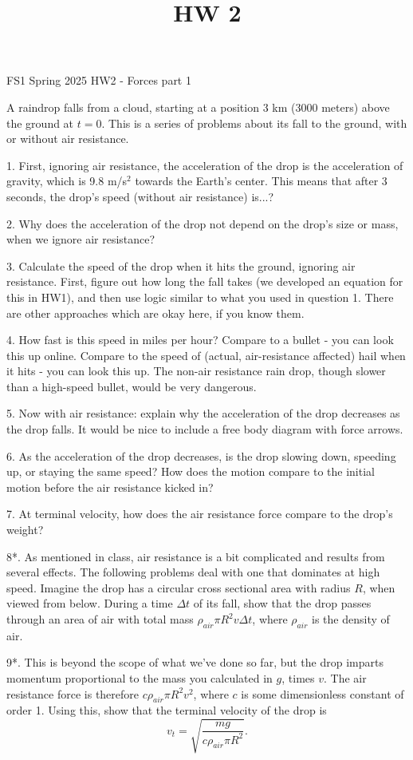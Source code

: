 \documentclass[12pt]{article}
\title{HW 2}
\begin{document}
\setlength{\parindent}{0pt}
\setlength{\parskip}{3mm}


FS1 Spring 2025
HW2 - Forces part 1

A raindrop falls from a cloud, starting at a position 3 km (3000 meters) above the ground at $t=0$. This is a series of problems about its fall to the ground, with or without air resistance.

1. First, ignoring air resistance, the acceleration of the drop is the acceleration of gravity, which is 9.8 m/s$^2$ towards the Earth's center. This means that after 3 seconds, the drop's speed (without air resistance) is...?

2. Why does the acceleration of the drop not depend on the drop's size or mass, when we ignore air resistance?

3. Calculate the speed of the drop when it hits the ground, ignoring air resistance. First, figure out how long the fall takes (we developed an equation for this in HW1), and then use logic similar to what you used in question 1. There are other approaches which are okay here, if you know them.

4. How fast is this speed in miles per hour? Compare to a bullet - you can look this up online. Compare to the speed of (actual, air-resistance affected) hail when it hits - you can look this up. The non-air resistance rain drop, though slower than a high-speed bullet, would be very dangerous.

5. Now with air resistance: explain why the acceleration of the drop decreases as the drop falls. It would be nice to include a free body diagram with force arrows.

6. As the acceleration of the drop decreases, is the drop slowing down, speeding up, or staying the same speed? How does the motion compare to the initial motion before the air resistance kicked in?

7. At terminal velocity, how does the air resistance force compare to the drop's weight?

8*. As mentioned in class, air resistance is a bit complicated and results from several effects. The following problems deal with one that dominates at high speed. Imagine the drop has a circular cross sectional area with radius $R$, when viewed from below. During a time $\Delta t$ of its fall, show that the drop passes through an area of air with total mass $\rho_{air} \pi R^2 v\Delta t$, where $\rho_{air}$ is the density of air.

9*. This is beyond the scope of what we've done so far, but the drop imparts momentum proportional to the mass you calculated in $g$, times $v$. The air resistance force is therefore $c\rho_{air} \pi R^2 v^2$, where $c$ is some dimensionless constant of order 1. Using this, show that the terminal velocity of the drop is 
\begin{equation}
v_t = \sqrt{\frac{mg}{c\rho_{air} \pi R^2}}.
 \end{equation}
\end{document}

